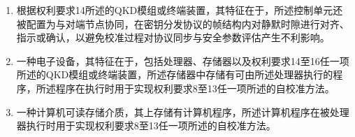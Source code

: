 \documentclass[12pt,a4paper]{article}
\begin{document}
\begin{enumerate}[label=\arabic*.,leftmargin=2em,itemsep=0.6em]
\item
根据权利要求14所述的QKD模组或终端装置，其特征在于，所述控制单元还被配置为与对端节点协同，在密钥分发协议的帧结构内对静默时隙进行对齐、指示或确认，以避免校准过程对协议同步与安全参数评估产生不利影响。

\item
一种电子设备，其特征在于，包括处理器、存储器以及权利要求14至16任一项所述的QKD模组或终端装置，所述存储器中存储有可由所述处理器执行的程序，所述程序在执行时用于实现权利要求8至13任一项所述的自校准方法。

\item
一种计算机可读存储介质，其上存储有计算机程序，所述计算机程序在被处理器执行时用于实现权利要求8至13任一项所述的自校准方法。

\end{enumerate}
\end{document}
